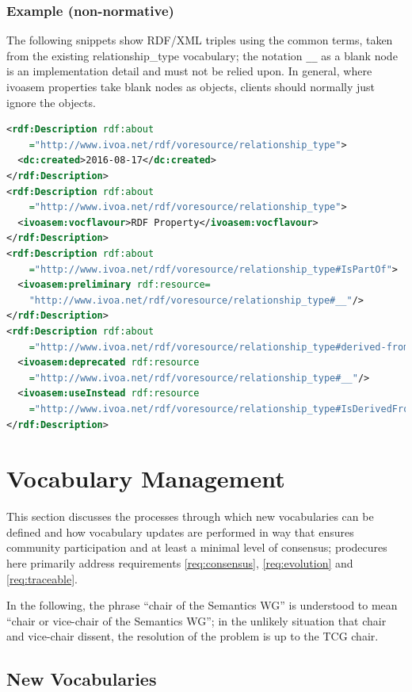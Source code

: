 \documentclass[11pt,a4paper]{ivoa}
\begin{document}
\subsubsection{Example (non-normative)}

The following snippets show RDF/XML triples using the common terms,
taken from the existing relationship\_type vocabulary; the notation
\verb|__| as a blank node is an implementation detail and must not be
relied upon.  In general, where ivoasem properties take blank nodes as
objects, clients should normally just ignore the objects.

\begin{lstlisting}[language=XML]
<rdf:Description rdf:about
    ="http://www.ivoa.net/rdf/voresource/relationship_type">
  <dc:created>2016-08-17</dc:created>
</rdf:Description>
<rdf:Description rdf:about
    ="http://www.ivoa.net/rdf/voresource/relationship_type">
  <ivoasem:vocflavour>RDF Property</ivoasem:vocflavour>
</rdf:Description>
<rdf:Description rdf:about
    ="http://www.ivoa.net/rdf/voresource/relationship_type#IsPartOf">
  <ivoasem:preliminary rdf:resource=
    "http://www.ivoa.net/rdf/voresource/relationship_type#__"/>
</rdf:Description>
<rdf:Description rdf:about
    ="http://www.ivoa.net/rdf/voresource/relationship_type#derived-from">
  <ivoasem:deprecated rdf:resource
    ="http://www.ivoa.net/rdf/voresource/relationship_type#__"/>
  <ivoasem:useInstead rdf:resource
    ="http://www.ivoa.net/rdf/voresource/relationship_type#IsDerivedFrom"/>
</rdf:Description>
\end{lstlisting}


\section{Vocabulary Management}
\label{sect:management}

This section discusses the processes through which new vocabularies can be
defined and how vocabulary updates are performed in way
that ensures community participation and at least a minimal level of
consensus; prodecures here primarily address requirements
\ref{req:consensus}, \ref{req:evolution} and \ref{req:traceable}.

In the following, the phrase ``chair of the Semantics WG'' is understood
to mean ``chair or vice-chair of the Semantics WG''; in the unlikely
situation that chair and vice-chair dissent, the resolution of the
problem is up to the TCG chair.


\subsection{New Vocabularies}
\label{sect:new-vocabularies}
\end{document}
